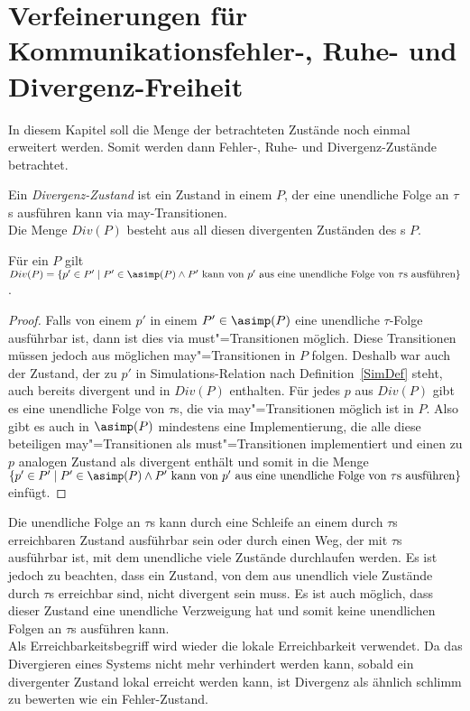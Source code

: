 \chapter{Verfeinerungen für Kommunikationsfehler-, Ruhe- und Divergenz-Freiheit}

In diesem Kapitel soll die Menge der betrachteten Zustände noch einmal
erweitert werden. Somit werden dann Fehler-, Ruhe- und Divergenz-Zustände
betrachtet.

\begin{Def}[Divergenz]
  Ein \emph{Divergenz-Zustand} ist ein Zustand in einem \MEIO{} $P$, der eine
  unendliche Folge an $\tau$s ausführen kann via may-Transitionen.\\
  Die Menge $Div(P)$ besteht aus all diesen divergenten Zuständen des \MEIO{}s
  $P$.
\end{Def}

\begin{Prop}
  \label{DivProp}
  Für ein \MEIO{} $P$ gilt $Div (P) = \left\{p'\in P'\mid P'\in\asimp (P)
  \land P' \text{ kann von } p' \text{ aus eine unendliche Folge von } \tau
  \text{s ausführen} \right\}$.
\end{Prop}
\begin{proof}
  Falls von einem $p'$ in einem $P'\in\asimp (P)$ eine unendliche $\tau$-Folge
  ausführbar ist, dann ist dies via must"=Transitionen möglich. Diese
  Transitionen müssen jedoch aus möglichen may"=Transitionen in $P$ folgen.
  Deshalb war auch der Zustand, der zu $p'$ in Simulations-Relation nach
  Definition~\ref{SimDef} steht, auch bereits divergent und in $Div (P)$
  enthalten. Für jedes $p$ aus $Div (P)$ gibt es eine unendliche Folge von
  $\tau$s, die via may"=Transitionen möglich ist in $P$. Also gibt es auch in
  $\asimp (P)$ mindestens eine Implementierung, die alle diese beteiligen
  may"=Transitionen als must"=Transitionen implementiert und einen zu $p$
  analogen Zustand als divergent enthält und somit in die Menge $\left\{p'\in
  P'\mid P'\in\asimp (P) \land P' \text{ kann von } p' \text{ aus eine
  unendliche Folge von } \tau \text{s ausführen} \right\}$ einfügt.
\end{proof}

Die unendliche Folge an $\tau$s kann durch eine Schleife an einem durch $\tau$s
erreichbaren Zustand ausführbar sein oder durch einen Weg, der mit $\tau$s
ausführbar ist, mit dem unendliche viele Zustände durchlaufen werden. Es ist
jedoch zu beachten, dass ein Zustand, von dem aus unendlich viele Zustände
durch $\tau$s  erreichbar sind, nicht divergent sein muss. Es ist auch möglich,
dass dieser Zustand eine unendliche Verzweigung hat und somit keine unendlichen
Folgen an $\tau$s ausführen kann.\\
Als Erreichbarkeitsbegriff wird wieder die lokale Erreichbarkeit verwendet. Da
das Divergieren eines Systems nicht mehr verhindert werden kann, sobald ein
divergenter Zustand lokal erreicht werden kann, ist Divergenz als ähnlich \glqq
schlimm\grqq{} zu bewerten wie ein Fehler-Zustand.

